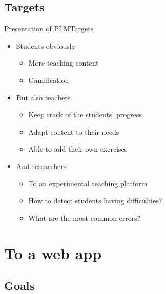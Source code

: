 \documentclass{beamer}
\begin{document}
\subsection{Targets}

\begin{frame}{Presentation of PLM}{Targets}
  \begin{itemize}
  \item {
    Students obviously
    \begin{itemize}
    \item {
      More teaching content
    }
    \item {
      Gamification
    }
    \end{itemize}
    \pause
  }
  \item {
    But also teachers
    \begin{itemize}
    \item {
      Keep track of the students' progress
    }
    \item {
      Adapt content to their needs
    }
    \item {
      Able to add their own exercises
    }
    \pause
    \end{itemize}
  }
  \item {
    And researchers
    \begin{itemize}
    \item {
      To an experimental teaching platform
    }
    \item {
      How to detect students having difficulties?
    }
    \item {
      What are the most common errors?
    }
    \end{itemize}
  }
  \end{itemize}
\end{frame}

\section{To a web app}

\subsection{Goals}
\end{document}
